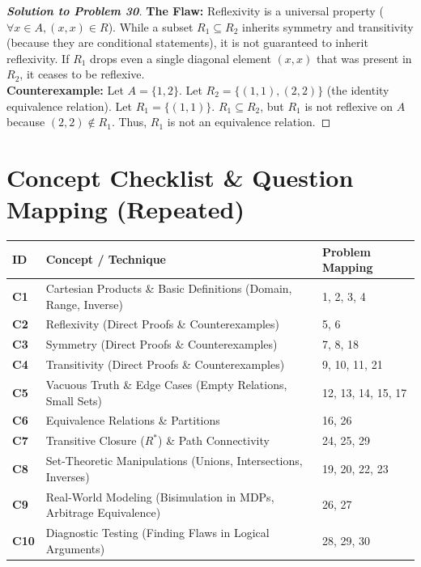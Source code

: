 \documentclass[11pt, a4paper]{article}
\theoremstyle{definition}
\theoremstyle{remark}
\begin{document}
\begin{proof}[\textbf{Solution to Problem 30}]
\textbf{The Flaw:} Reflexivity is a universal property ($\forall x \in A, (x, x) \in R$). While a subset $R_1 \subseteq R_2$ inherits symmetry and transitivity (because they are conditional statements), it is not guaranteed to inherit reflexivity. If $R_1$ drops even a single diagonal element $(x, x)$ that was present in $R_2$, it ceases to be reflexive. \\
\textbf{Counterexample:} Let $A = \{1, 2\}$. Let $R_2 = \{(1, 1), (2, 2)\}$ (the identity equivalence relation). Let $R_1 = \{(1, 1)\}$. $R_1 \subseteq R_2$, but $R_1$ is not reflexive on $A$ because $(2, 2) \notin R_1$. Thus, $R_1$ is not an equivalence relation.
\end{proof}

\newpage

\section{Concept Checklist \& Question Mapping (Repeated)}
\label{sec:checklist_end}

\vspace{1em}
\noindent
\begin{tabularx}{\textwidth}{>{\bfseries}l X l}
\toprule
ID & Concept / Technique & Problem Mapping \\
\midrule
C1 & Cartesian Products \& Basic Definitions (Domain, Range, Inverse) & 1, 2, 3, 4 \\
\addlinespace[4pt]
C2 & Reflexivity (Direct Proofs \& Counterexamples) & 5, 6 \\
\addlinespace[4pt]
C3 & Symmetry (Direct Proofs \& Counterexamples) & 7, 8, 18 \\
\addlinespace[4pt]
C4 & Transitivity (Direct Proofs \& Counterexamples) & 9, 10, 11, 21 \\
\addlinespace[4pt]
C5 & Vacuous Truth \& Edge Cases (Empty Relations, Small Sets) & 12, 13, 14, 15, 17 \\
\addlinespace[4pt]
C6 & Equivalence Relations \& Partitions & 16, 26 \\
\addlinespace[4pt]
C7 & Transitive Closure ($R^*$) \& Path Connectivity & 24, 25, 29 \\
\addlinespace[4pt]
C8 & Set-Theoretic Manipulations (Unions, Intersections, Inverses) & 19, 20, 22, 23 \\
\addlinespace[4pt]
C9 & Real-World Modeling (Bisimulation in MDPs, Arbitrage Equivalence) & 26, 27 \\
\addlinespace[4pt]
C10 & Diagnostic Testing (Finding Flaws in Logical Arguments) & 28, 29, 30 \\
\bottomrule
\end{tabularx}
\end{document}
